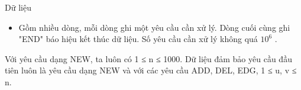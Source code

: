 Dữ liệu
\begin{itemize}
	\item     Gồm nhiều dòng, mỗi dòng ghi một yêu cầu cần xử lý. Dòng cuối cùng ghi "END" báo hiệu kết thúc dữ liệu. Số yêu cầu cần xử lý không quá $10^{6}$    .   
\end{itemize}

   Với yêu cầu dạng NEW, ta luôn có 1 ≤ n ≤ 1000. Dữ liệu đảm bảo yêu cầu đầu tiên luôn là yêu cầu dạng NEW và với các yêu cầu ADD, DEL, EDG, 1 ≤ u, v ≤ n.